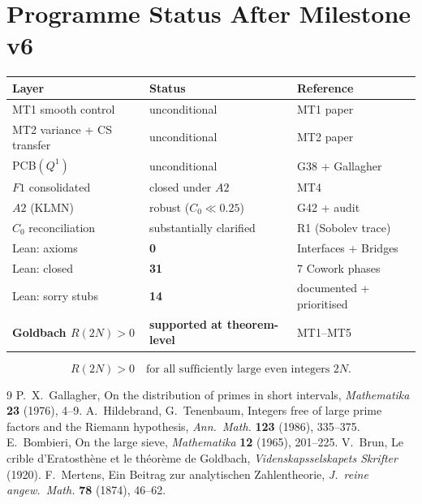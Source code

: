 \documentclass[11pt,a4paper]{article}
\begin{document}
\section{Programme Status After Milestone v6}

\begin{center}
\begin{tabular}{@{}lll@{}}
\toprule
\textbf{Layer} & \textbf{Status} & \textbf{Reference} \\
\midrule
MT1 smooth control & unconditional & MT1 paper \\
MT2 variance + CS transfer & unconditional & MT2 paper \\
PCB$(Q^1)$ & unconditional & G38 + Gallagher \\
$F1$ consolidated & closed under $A2$ & MT4 \\
$A2$ (KLMN) & robust ($C_0\ll 0.25$) & G42 + audit \\
$C_0$ reconciliation & substantially clarified & R1 (Sobolev trace) \\
\midrule
Lean: axioms & \textbf{0} & Interfaces + Bridges \\
Lean: closed & \textbf{31} & 7 Cowork phases \\
Lean: sorry stubs & \textbf{14} & documented + prioritised \\
\midrule
\textbf{Goldbach $R(2N)>0$} & \textbf{supported at theorem-level} & MT1--MT5 \\
\bottomrule
\end{tabular}
\end{center}

\[
\boxed{R(2N) > 0 \quad\text{for all sufficiently large even integers }2N.}
\]

\begin{thebibliography}{9}
 P.~X.~Gallagher, On the distribution of primes in short intervals, \textit{Mathematika} \textbf{23} (1976), 4--9.
 A.~Hildebrand, G.~Tenenbaum, Integers free of large prime factors and the Riemann hypothesis, \textit{Ann.\ Math.} \textbf{123} (1986), 335--375.
 E.~Bombieri, On the large sieve, \textit{Mathematika} \textbf{12} (1965), 201--225.
 V.~Brun, Le crible d'Eratosthène et le théorème de Goldbach, \textit{Videnskapsselskapets Skrifter} (1920).
 F.~Mertens, Ein Beitrag zur analytischen Zahlentheorie, \textit{J.~reine angew.~Math.} \textbf{78} (1874), 46--62.
\end{thebibliography}
\end{document}
